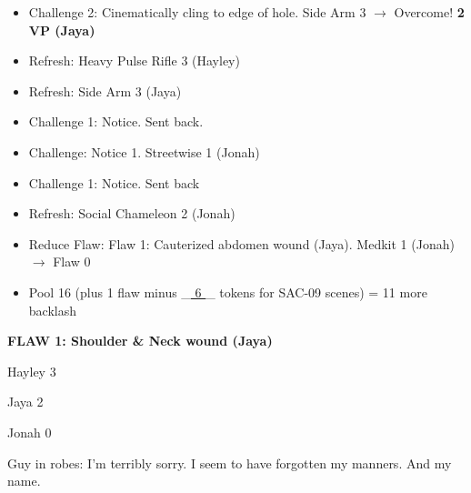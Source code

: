 \begin{itemize}
\item Challenge 2: Cinematically cling to edge of hole.  Side Arm 3 $\rightarrow$  Overcome! \textbf{2 VP (Jaya)}
\item Refresh: Heavy Pulse Rifle 3 (Hayley)
\item Refresh: Side Arm 3 (Jaya)
\item Challenge 1: Notice.  Sent back.
\item Challenge: Notice 1.  Streetwise 1 (Jonah)
\item Challenge 1: Notice.  Sent back
\item Refresh: Social Chameleon 2 (Jonah)
\item Reduce Flaw:  {\color[RGB]{255,0,0}Flaw 1: Cauterized abdomen wound (Jaya).}   Medkit 1 (Jonah) $\rightarrow$ Flaw 0
\item Pool 16 (plus 1 flaw minus \_\underline{ 6 }\_ tokens for SAC-09 scenes) = 11 more backlash
\end{itemize}





\textbf{ {\color[RGB]{255,0,0}FLAW 1: Shoulder \& Neck wound (Jaya)} }





Hayley 3

Jaya 2

Jonah 0








Guy in robes: I'm terribly sorry.  I seem to have forgotten my manners.  And my name.


